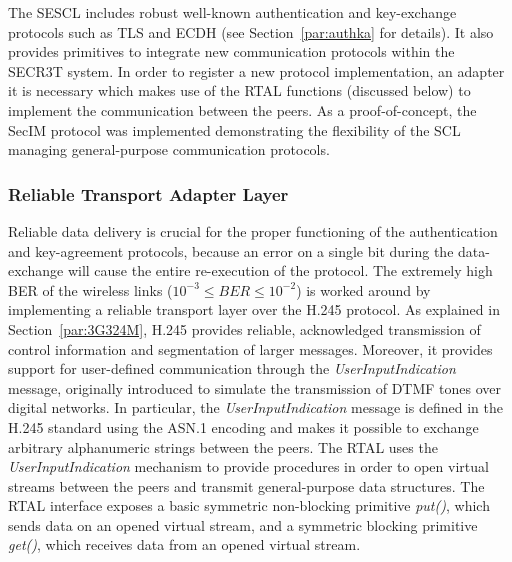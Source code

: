 \documentclass[10pt, conference, compsocconf]{IEEEtran}
\begin{document}
The SESCL includes robust well-known authentication and key-exchange protocols such as TLS and ECDH (see Section~\ref{par:authka} for details). It also provides primitives to integrate new communication protocols within the SECR3T system. In order to register a new protocol implementation, an adapter it is necessary which makes use of the RTAL functions (discussed below) to implement the communication between the peers. As a proof-of-concept, the SecIM protocol was implemented demonstrating the flexibility of the SCL managing general-purpose communication protocols.
\\

\subsubsection{Reliable Transport Adapter Layer}
Reliable data delivery is crucial for the proper functioning of the authentication and key-agreement protocols, because an error on a single bit during the data-exchange will cause the entire re-execution of the protocol. The extremely high BER of the wireless links ($ 10^{-3} \leq BER \leq 10^{-2} $) is worked around by implementing a reliable transport layer over the H.245 protocol.
As explained in Section~\ref{par:3G324M}, H.245 provides reliable, acknowledged transmission of control information and segmentation of larger messages. Moreover, it provides support for user-defined communication through the \textit{UserInputIndication} message, originally introduced to simulate the transmission of DTMF tones over digital networks. In particular, the \textit{UserInputIndication} message is defined in the H.245 standard using the ASN.1 encoding and makes it possible to exchange arbitrary alphanumeric strings between the peers.
The RTAL uses the \textit{UserInputIndication} mechanism to provide procedures in order to open virtual streams between the peers and transmit general-purpose data structures. The RTAL interface exposes a basic symmetric non-blocking primitive \emph{put()}, which sends data on an opened virtual stream, and a symmetric blocking primitive \emph{get()}, which receives data from an opened virtual stream.
\end{document}
